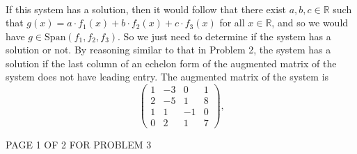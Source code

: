 \documentclass[12pt]{article}
\newenvironment{problem}[2][Problem]
{
	\begin{trivlist} 
		\item[\hskip \labelsep {\bfseries #1 #2:}]
	}
{
	\end{trivlist}
	}
\newenvironment{solution}[1][Solution]
{
	\begin{trivlist} 
		\item[\hskip \labelsep {\itshape #1:}]
	}
	{
	\end{trivlist}
}
\begin{document}
\begin{problem}{3}
\begin{solution}
\begin{align*}
\end{align*}
If this system has a solution, then it would follow that there exist $a,b,c \in \mathbb{R}$ such that $g(x)=a\cdot f_1(x) + b\cdot f_2(x) + c\cdot f_3(x)$ for all $x\in \mathbb{R}$, and so we would have $g\in \text{Span}(f_1,f_2,f_3)$. So we just need to determine if the system has a solution or not. By reasoning similar to that in Problem 2, the system has a solution if the last column of an echelon form of the augmented matrix of the system does not have leading entry. The augmented matrix of the system is
\[
\begin{pmatrix}1&-3&0&1\\2&-5&1&8\\1&1&-1&0\\0&2&1&7\end{pmatrix}\text{,}
\]
\end{solution}
\vfill
\centerline{PAGE 1 OF 2 FOR PROBLEM 3}
\end{problem}
\end{document}
